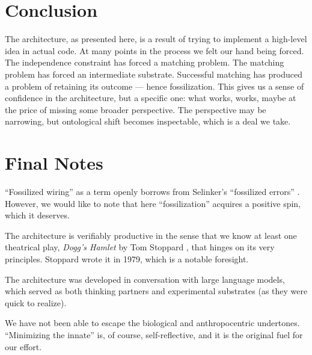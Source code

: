 \documentclass[12pt, a4paper]{article}
\begin{document}
\section{Conclusion}

The architecture, as presented here, is a result of trying to implement
a high-level idea in actual code. At many points in the process we felt
our hand being forced. The independence constraint has forced a matching
problem. The matching problem has forced an intermediate substrate.
Successful matching has produced a problem of retaining its outcome ---
hence fossilization. This gives us a sense of confidence in the
architecture, but a specific one: what works, works, maybe at the price
of missing some broader perspective. The perspective may be narrowing,
but ontological shift becomes inspectable, which is a deal we take.

\section*{Final Notes}

``Fossilized wiring'' as a term openly borrows from Selinker's
``fossilized errors'' \cite{selinker1972}. However, we would like to
note that here ``fossilization'' acquires a positive spin, which it
deserves.

The architecture is verifiably productive in the sense that we know at
least one theatrical play, \textit{Dogg's Hamlet} by Tom Stoppard
\cite{stoppard1979}, that hinges on its very principles. Stoppard wrote
it in 1979, which is a notable foresight.

The architecture was developed in conversation with large language
models, which served as both thinking partners and experimental
substrates (as they were quick to realize).

We have not been able to escape the biological and anthropocentric
undertones. ``Minimizing the innate'' is, of course, self-reflective,
and it is the original fuel for our effort.
\end{document}
